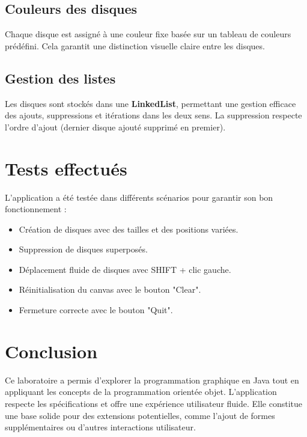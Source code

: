 \documentclass[12pt]{report}
\begin{document}
    \subsection*{Couleurs des disques}
    Chaque disque est assigné à une couleur fixe basée sur un tableau de couleurs prédéfini. Cela garantit une distinction visuelle claire entre les disques.

    \subsection*{Gestion des listes}
    Les disques sont stockés dans une \textbf{LinkedList}, permettant une gestion efficace des ajouts, suppressions et itérations dans les deux sens.
    La suppression respecte l'ordre d'ajout (dernier disque ajouté supprimé en premier).

    \section*{Tests effectués}
    L'application a été testée dans différents scénarios pour garantir son bon fonctionnement :
    \begin{itemize}
        \item Création de disques avec des tailles et des positions variées.
        \item Suppression de disques superposés.
        \item Déplacement fluide de disques avec SHIFT + clic gauche.
        \item Réinitialisation du canvas avec le bouton "Clear".
        \item Fermeture correcte avec le bouton "Quit".
    \end{itemize}

    \section*{Conclusion}
    Ce laboratoire a permis d'explorer la programmation graphique en Java tout en appliquant les concepts de la programmation orientée objet.
    L'application respecte les spécifications et offre une expérience utilisateur fluide. Elle constitue une base solide pour des extensions potentielles, comme l'ajout de formes supplémentaires ou d'autres interactions utilisateur.
\end{document}
